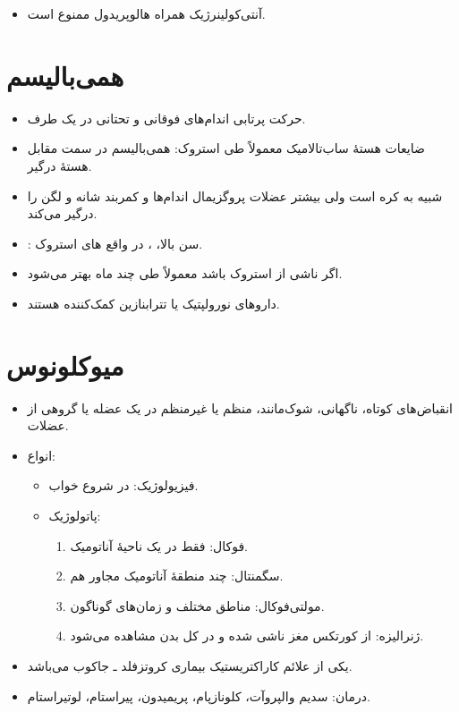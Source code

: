 \documentclass[a4paper,12pt]{extbook}
\begin{document}
\begin{itemize}
\item آنتی‌کولینرژیک همراه هالوپریدول ممنوع است.
\end{itemize}
\section*{همی‌بالیسم}
\begin{itemize}
\item حرکت پرتابی اندام‌های فوقانی و تحتانی در یک طرف.
\item ضایعات هستهٔ ساب‌تالامیک معمولاً طی استروک: همی‌بالیسم در سمت مقابل هستهٔ درگیر.
\item شبیه به کره است ولی بیشتر عضلات پروگزیمال اندام‌ها و کمربند شانه و لگن را درگیر می‌کند.
\item {}: سن بالا، ،  \MDen{$\Leftarrow$} در واقع های استروک.
\item اگر ناشی از استروک باشد معمولاً طی چند ماه بهتر می‌شود.
\item داروهای نورولپتیک یا تترا‌بنازین کمک‌کننده هستند.
\end{itemize}
\section*{میوکلونوس}
\begin{itemize}
\item انقباض‌های کوتاه، ناگهانی، شوک‌مانند، منظم یا غیرمنظم در یک عضله یا گروهی از عضلات.
\item انواع:
\begin{itemize}
\item فیزیولوژیک: در شروع خواب.
\item پاتولوژیک:
\begin{enumerate}[label=\alph*)]
\item فوکال: فقط در یک ناحیهٔ آناتومیک.
\item سگمنتال: چند منطقهٔ آناتومیک مجاور هم.
\item مولتی‌فوکال: مناطق مختلف و زمان‌های گوناگون.
\item ژنرالیزه: از کورتکس مغز ناشی شده و در کل بدن مشاهده می‌شود.
\end{enumerate}
\end{itemize}
\item یکی از علائم کاراکتریستیک بیماری کروتزفلد ـ جاکوب می‌باشد.
\item درمان: سدیم والپروآت، کلونازپام، پریمیدون، پیراستام، لوتیراستام.
\end{itemize}
\end{document}
